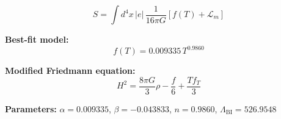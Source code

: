 
\begin{equation}
  S = \int d^4x \, |e| \, \frac{1}{16\pi G} \left[ f(T) + \mathcal{L}_m \right]
\end{equation}

\textbf{Best-fit model:}
\begin{equation}
  f(T) = 0.009335 \, T^{0.9860}
\end{equation}

\textbf{Modified Friedmann equation:}
\begin{equation}
  H^2 = \frac{8\pi G}{3} \rho - \frac{f}{6} + \frac{T f_T}{3}
\end{equation}

\textbf{Parameters:}
$\alpha = 0.009335$, \quad
$\beta = -0.043833$, \quad
$n = 0.9860$, \quad
$\Lambda_{\text{BI}} = 526.9548$
